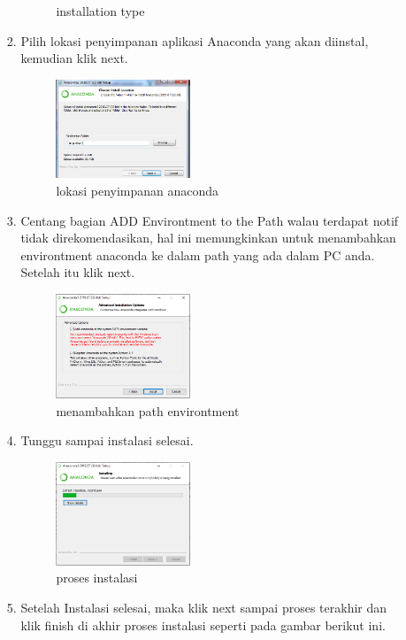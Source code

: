 \begin{enumerate}
\begin{itemize}
\begin{enumerate}
\begin{figure}[H]
			\centering
			\caption{installation type}
			\end{figure}
		\item Pilih lokasi penyimpanan aplikasi Anaconda yang akan diinstal, kemudian klik next.\\
			\begin{figure}[H]
			\includegraphics[width=4cm]{figures/1184026/anaconda/anaconda4.png}
			\centering
			\caption{lokasi penyimpanan anaconda}
			\end{figure}
		\item Centang bagian ADD Environtment to the Path walau terdapat notif tidak direkomendasikan, hal ini memungkinkan untuk menambahkan environtment anaconda ke dalam path yang ada dalam PC anda. Setelah itu klik next.
			\begin{figure}[H]
			\includegraphics[width=4cm]{figures/1184026/anaconda/anaconda5.png}
			\centering
			\caption{menambahkan path environtment}
			\end{figure}
		\item Tunggu sampai instalasi selesai.
			\begin{figure}[H]
			\includegraphics[width=4cm]{figures/1184026/anaconda/anaconda6.png}
			\centering
			\caption{proses instalasi}
			\end{figure}
		\item Setelah Instalasi selesai, maka klik next sampai proses terakhir dan klik finish di akhir proses instalasi seperti pada gambar berikut ini.\\
			\begin{figure}[H]

\end{figure}
\end{enumerate}
\end{itemize}
\end{enumerate}
